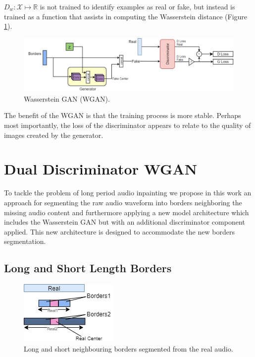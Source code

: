 \documentclass{article} %
\begin{document}
$D_w : \mathcal{X} \mapsto \mathbb{R}$ is not trained to identify examples as real or fake, but instead is trained as a function that assists in computing the Wasserstein distance (Figure \ref{fig:wgan}).

\begin{figure}[h]
    \includegraphics[scale=0.36]{images/model_basic2.jpg}
    \centering
    \caption{Wasserstein GAN (WGAN).}
    \label{fig:wgan}
\end{figure}

The benefit of the WGAN is that the training process is more stable. Perhaps most importantly, the loss of the discriminator appears to relate to the quality of images created by the generator.

\section{Dual Discriminator WGAN}
To tackle the problem of long period audio inpainting we propose in this work an approach for segmenting the raw audio waveform into borders neighboring the missing audio content and furthermore applying a new model architecture which includes the Wasserstein GAN but with an additional discriminator component applied. This new architecture is designed to accommodate the new borders segmentation. 

\subsection{Long and Short Length Borders}

\begin{figure}
    \includegraphics[scale=0.7]{images/borders.jpg}
    \centering
    \caption{Long and short neighbouring borders segmented from the real audio.}
    \label{fig:borders}
\end{figure}
\end{document}

